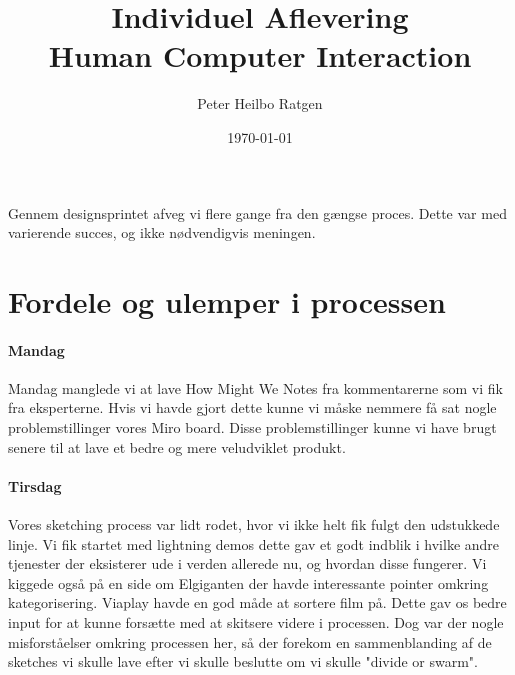 \documentclass{article}
\title{Individuel Aflevering \\ \vspace{0.3cm} \large{Human Computer Interaction}}
\author{Peter Heilbo Ratgen}
\date{\today}
\begin{document}
\maketitle
Gennem designsprintet afveg vi flere gange fra den gængse proces. Dette var med
varierende succes, og ikke nødvendigvis meningen.

\section{Fordele og ulemper i processen}


\paragraph{Mandag}

Mandag manglede vi at lave How Might We Notes fra kommentarerne som vi fik fra
eksperterne. Hvis vi havde gjort dette kunne vi måske nemmere få sat nogle
problemstillinger vores Miro board. Disse problemstillinger kunne vi have brugt
senere til at lave et bedre og mere veludviklet produkt.

\paragraph{Tirsdag}


Vores sketching process var lidt rodet, hvor vi ikke helt fik fulgt den
udstukkede linje. Vi fik startet med lightning demos dette gav et godt indblik i
hvilke andre tjenester der eksisterer ude i verden allerede nu, og hvordan disse
fungerer. Vi kiggede også på en side om Elgiganten der havde interessante
pointer omkring kategorisering.  Viaplay havde en god måde at sortere film på.
Dette gav os bedre input for at kunne forsætte med at skitsere videre i
processen. Dog var der nogle misforståelser omkring processen her, så der
forekom en sammenblanding af de sketches vi skulle lave efter vi skulle beslutte
om vi skulle "divide or swarm".
\end{document}
